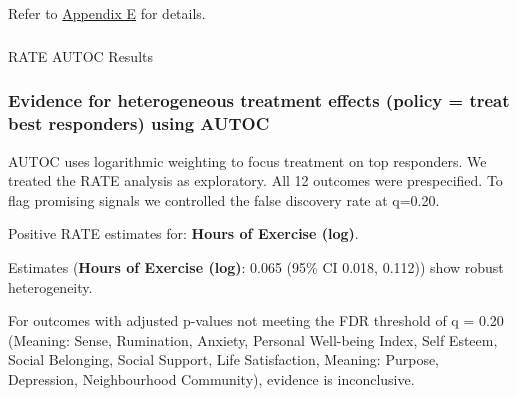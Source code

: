 \documentclass[
  single column]{article}
\makeatletter
\let\oldsubparagraph\subparagraph
\renewcommand{\subparagraph}{
    \@ifstar
      \xxxSubParagraphStar
      \xxxSubParagraphNoStar
  }
\newcommand{\xxxSubParagraphStar}[1]{\oldsubparagraph*{#1}\mbox{}}
\newcommand{\xxxSubParagraphNoStar}[1]{\oldsubparagraph{#1}\mbox{}}
\makeatother
\begin{document}
Refer to \hyperref[appendix-cate-validation]{Appendix E} for details.

\subparagraph{RATE AUTOC Results}\label{rate-autoc-results}

\subsubsection{Evidence for heterogeneous treatment effects (policy =
treat best responders) using
AUTOC}\label{evidence-for-heterogeneous-treatment-effects-policy-treat-best-responders-using-autoc}

AUTOC uses logarithmic weighting to focus treatment on top responders.
We treated the RATE analysis as exploratory. All 12 outcomes were
prespecified. To flag promising signals we controlled the false
discovery rate at q=0.20.

Positive RATE estimates for: \textbf{Hours of Exercise (log)}.

Estimates (\textbf{Hours of Exercise (log)}: 0.065 (95\% CI 0.018,
0.112)) show robust heterogeneity.

For outcomes with adjusted p-values not meeting the FDR threshold of q =
0.20 (Meaning: Sense, Rumination, Anxiety, Personal Well-being Index,
Self Esteem, Social Belonging, Social Support, Life Satisfaction,
Meaning: Purpose, Depression, Neighbourhood Community), evidence is
inconclusive.
\end{document}
